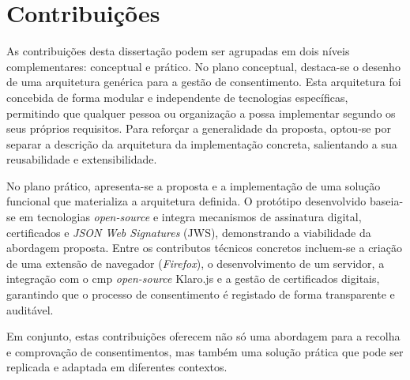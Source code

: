 
\section{Contribuições}

As contribuições desta dissertação podem ser agrupadas em dois níveis complementares: conceptual e prático. 
No plano conceptual, destaca-se o desenho de uma arquitetura genérica para a gestão de consentimento. Esta arquitetura foi concebida de forma modular e independente de tecnologias específicas, permitindo que qualquer pessoa ou organização a possa implementar segundo os seus próprios requisitos. Para reforçar a generalidade da proposta, optou-se por separar a descrição da arquitetura da implementação concreta, salientando a sua reusabilidade e extensibilidade.

No plano prático, apresenta-se a proposta e a implementação de uma solução funcional que materializa a arquitetura definida. O protótipo desenvolvido baseia-se em tecnologias \textit{open-source} e integra mecanismos de assinatura digital, certificados e \textit{JSON Web Signatures} (JWS), demonstrando a viabilidade da abordagem proposta. Entre os contributos técnicos concretos incluem-se a criação de uma extensão de navegador (\textit{Firefox}), o desenvolvimento de um servidor, a integração com o \acrshort{cmp} \textit{open-source} Klaro.js e a gestão de certificados digitais, garantindo que o processo de consentimento é registado de forma transparente e auditável.

Em conjunto, estas contribuições oferecem não só uma abordagem para a recolha e comprovação de consentimentos, mas também uma solução prática que pode ser replicada e adaptada em diferentes contextos.

